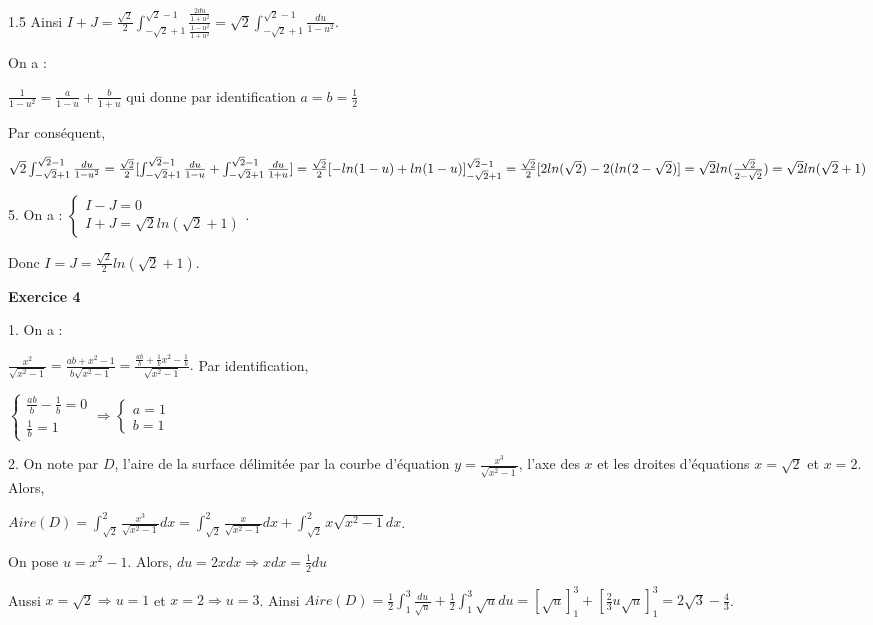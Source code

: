 \documentclass[12pt]{article}
\begin{document}
\begin{spacing}{1.5}
Ainsi $I+J=\frac{\sqrt{2}}{2}\int_{-\sqrt{2}+1}^{\sqrt{2}-1}\frac{\frac{2du}{1+u^2}}{\frac{1-u^2}{1+u^2}}=\sqrt{2}\int_{-\sqrt{2}+1}^{\sqrt{2}-1}\frac{du}{1-u^2}$.

On a : 

$\frac{1}{1-u^2}=\frac{a}{1-u}+\frac{b}{1+u}$ qui donne par identification $a=b=\frac{1}{2}$

Par conséquent, 

$
\sqrt{2}\int_{-\sqrt{2}+1}^{\sqrt{2}-1}\frac{du}{1-u^2}=\frac{\sqrt{2}}{2}[     \int_{-\sqrt{2}+1}^{\sqrt{2}-1}\frac{du}{1-u}+\int_{-\sqrt{2}+1}^{\sqrt{2}-1}\frac{du}{1+u}]      \\
=\frac{\sqrt{2}}{2}[-ln(1-u)+ln(1-u)]_{-\sqrt{2}+1}^{\sqrt{2}-1}\\
=\frac{\sqrt{2}}{2}[2ln(\sqrt{2})-2(ln(2-\sqrt{2})]\\
=\sqrt{2}ln(\frac{\sqrt{2}}{2-\sqrt{2}})
=\sqrt{2}ln(\sqrt{2}+1)
$

5. On a :
$
\begin{cases}
I-J=0\\
I+J=\sqrt{2}ln(\sqrt{2}+1)
\end{cases}.
$

Donc $I=J=\frac{\sqrt{2}}{2}ln(\sqrt{2}+1)$.

\medskip\textbf{Exercice 4}

1. On a :

$
\frac{x^2}{\sqrt{x^2-1}}=\frac{ab+x^2-1}{b\sqrt{x^2-1}}=\frac{\frac{ab}{b}+\frac{1}{b}x^2-\frac{1}{b}}{\sqrt{x^2-1}}.
$
Par identification, 

$\begin{cases}
\frac{ab}{b}-\frac{1}{b}=0\\
\frac{1}{b}=1
\end{cases}\Longrightarrow \begin{cases}
a=1\\
b=1
\end{cases}$

2. On note par $D$, l'aire de la surface délimitée par la courbe d'équation $y =\frac{x^3}{\sqrt{x^2-1}}$, l'axe des $x$ et les droites d'équations $x=\sqrt{2}$ et $x=2$. Alors, 

$Aire(D)=\int_{\sqrt{2}}^{2}\frac{x^3}{\sqrt{x^2-1}}dx=\int_{\sqrt{2}}^{2}\frac{x}{\sqrt{x^2-1}}dx+\int_{\sqrt{2}}^{2}x\sqrt{x^2-1}dx$.

On pose $u=x^2-1$. Alors, $du=2xdx\Longrightarrow xdx=\frac{1}{2}du$

Aussi $x=\sqrt{2}\Longrightarrow u=1$ et $x=2\Longrightarrow u=3$. Ainsi $Aire(D)=\frac{1}{2}\int_1^3\frac{du}{\sqrt{u}}+\frac{1}{2}\int_1^3\sqrt{u}du=[\sqrt{u}]_1^3+[\frac{2}{3}u\sqrt{u}]_1^3=2\sqrt{3}-\frac{4}{3}$.


\end{spacing}
\end{document}
